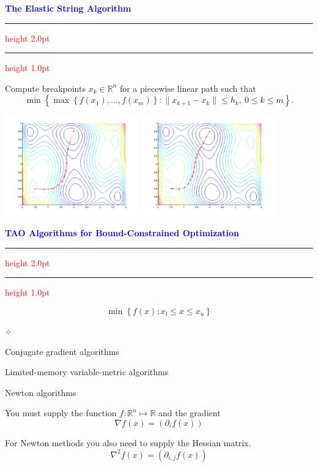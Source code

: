 \documentclass{seminar}
\newcommand{\R}{\mbox{${\mathbb R}$}}
\newcommand{\grad}{\nabla}
\newcommand{\reddiamond}{\textcolor{red}{$\diamond$}}
\newcommand{\redstripe}{\textcolor{red}{\hrule height 2.0pt\hfil}
             \vspace{-1.8pt}
             \textcolor{red}{\hrule height 1.0pt\hfil}
}
\newcommand{\heading}[1]{%
   \centerline{\textcolor{blue}{\textbf{#1}}}%
    \redstripe%
    \bigskip
}
\begin{document}
\begin{slide}

\heading{The Elastic String Algorithm}

Compute breakpoints $ x_k \in \R^n $ for a piecewise linear path such that
\[
\min \left \{ \max \left \{ f (x_1) , \ldots , f(x_m) \right \}
: \| x_{k+1} - x_k \| \le h_k , 
\ 0 \le k \le m \right \} .
\]

\bigskip

\ifpdf
\centerline{
\includegraphics[height=1.7in]{../images/camel10} \hfil
\includegraphics[height=1.7in]{../images/camel15}
}
\else
\fi

\vfill

\end{slide}

\begin{slide}

\heading{TAO Algorithms for Bound-Constrained Optimization}

\[
\min \left \{  f(x) : x_l \le x \le x_u \right \}
\]

\medskip

\begin{list}{\reddiamond}{}
\item
Conjugate gradient algorithms
\item
Limited-memory variable-metric algorithms
\item
Newton algorithms
\end{list}

You must supply the function $ f : \R^n \mapsto \R $ and the
gradient 
\[
\grad f (x) = \left ( \partial _i f(x) \right )
\]

For Newton methods you also need to supply the Hessian matrix.
\[
\grad^2 f (x) = \left ( \partial_{i,j} f(x) \right )
\]

\vfill

\end{slide}
\end{document}
